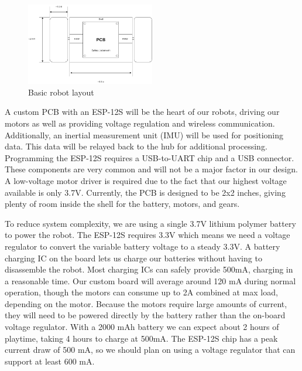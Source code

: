 \documentclass[11pt]{ieeeconf}
\begin{document}
 \begin{figure}[H]
  \centering
      \includegraphics[width=0.5\textwidth]{images/RobotSchematic}
        \caption{Basic robot layout}
        \label{RobotFig}
\end{figure}

A custom PCB with an ESP-12S will be the heart of our robots, driving our motors as well as providing voltage regulation and wireless communication. Additionally, an inertial measurement unit (IMU) will be used for positioning data. This data will be relayed back to the hub for additional processing. Programming the ESP-12S requires a USB-to-UART chip and a USB connector. These components are very common and will not be a major factor in our design. A low-voltage motor driver is required due to the fact that our highest voltage available is only 3.7V. Currently, the PCB is designed to be 2x2 inches, giving plenty of room inside the shell for the battery, motors, and gears.

To reduce system complexity, we are using a single 3.7V lithium polymer battery to power the robot. The ESP-12S requires 3.3V which means we need a voltage regulator to convert the variable battery voltage to a steady 3.3V. A battery charging IC on the board lets us charge our batteries without having to disassemble the robot. Most charging ICs can safely provide 500mA, charging in a reasonable time. Our custom board will average around 120 mA during normal operation, though the motors can consume up to 2A combined at max load, depending on the motor. Because the motors require large amounts of current, they will need to be powered directly by the battery rather than the on-board voltage regulator. With a 2000 mAh battery we can expect about 2 hours of playtime, taking 4 hours to charge at 500mA. The ESP-12S chip has a peak current draw of 500 mA, so we should plan on using a voltage regulator that can support at least 600 mA.
\end{document}
